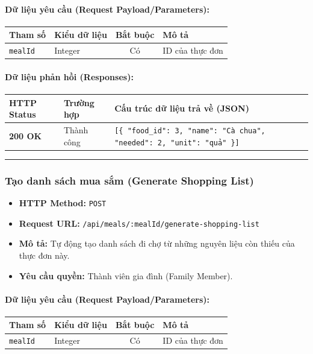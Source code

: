 \documentclass[12pt,a4paper]{article}
\begin{document}
\paragraph{Dữ liệu yêu cầu (Request Payload/Parameters):}
\begin{longtable}{|p{2.8cm}|p{2.2cm}|c|p{7.0cm}|}
\hline
\textbf{Tham số} & \textbf{Kiểu dữ liệu} & \textbf{Bắt buộc} & \textbf{Mô tả} \\ \hline
\endhead
\texttt{mealId} & Integer & Có & ID của thực đơn \\ \hline
\end{longtable}

\paragraph{Dữ liệu phản hồi (Responses):}
\begin{longtable}{|p{2.8cm}|p{3.2cm}|p{8.0cm}|}
\hline
\textbf{HTTP Status} & \textbf{Trường hợp} & \textbf{Cấu trúc dữ liệu trả về (JSON)} \\ \hline
\endhead
\textbf{200 OK} & Thành công & \texttt{[\{ "food\_id": 3, "name": "Cà chua", "needed": 2, "unit": "quả" \}]} \\ \hline
\end{longtable}

\vskip 0.4cm
\noindent\rule{\textwidth}{0.3pt}
\vskip 0.4cm

\subsubsection{Tạo danh sách mua sắm (Generate Shopping List)}
\begin{itemize}[leftmargin=*]
    \item \textbf{HTTP Method:} \texttt{POST}
    \item \textbf{Request URL:} \texttt{/api/meals/:mealId/generate-shopping-list}
    \item \textbf{Mô tả:} Tự động tạo danh sách đi chợ từ những nguyên liệu còn thiếu của thực đơn này.
    \item \textbf{Yêu cầu quyền:} Thành viên gia đình (Family Member).
\end{itemize}

\paragraph{Dữ liệu yêu cầu (Request Payload/Parameters):}
\begin{longtable}{|p{2.8cm}|p{2.2cm}|c|p{7.0cm}|}
\hline
\textbf{Tham số} & \textbf{Kiểu dữ liệu} & \textbf{Bắt buộc} & \textbf{Mô tả} \\ \hline
\endhead
\texttt{mealId} & Integer & Có & ID của thực đơn \\ \hline
\end{longtable}
\end{document}
